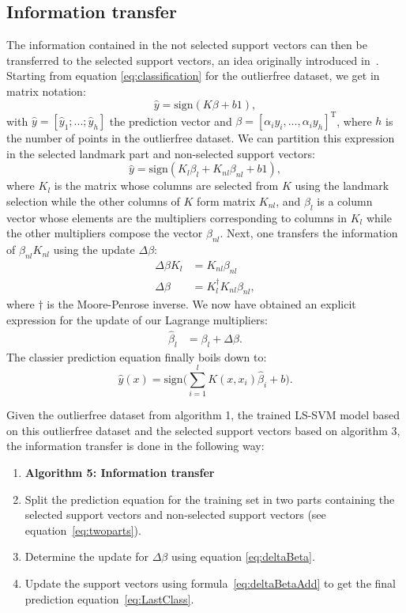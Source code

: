 \documentclass[preprint,12pt]{elsarticle}
\begin{document}
	\subsection{Information transfer}
	The information contained in the not selected support vectors can then be transferred to the selected support vectors, an idea originally introduced in~\cite{tao2009fast}. Starting from equation \eqref{eq:classification} for the outlierfree dataset, we get in matrix notation:
	\begin{equation}
\hat{y} = \mathrm{sign}(K\beta  + b 1),
	\end{equation}
with $\hat{y} = [\hat{y}_1;...;\hat{y}_h]$ the prediction vector and $\beta = [\alpha_i y_i ,...,\alpha_i y_{h}]^\mathrm{T}$, where $h$ is the number of points in the outlierfree dataset.
We can partition this expression in the selected landmark part and non-selected support vectors:
	\begin{equation}
	\label{eq:twoparts}
\hat{y} = \mathrm{sign}(K_l\beta_l + K_{nl}\beta_{nl}  + b 1),
	\end{equation}
	where $K_l $ is the matrix whose columns are selected from $K$ using the landmark selection while the other columns of $K$ form matrix $K_{nl}$, and $\beta_l$ is a column vector whose elements are the multipliers corresponding to columns in $K_l $ while the other multipliers compose the vector $ \beta_{nl}$.
	Next, one transfers the information of $\beta_{nl} K_{nl}$ using the update $\Delta\beta$: 
	\begin{align}
	\Delta \beta K_l &= K_{nl} \beta_{nl}   \\
	\Delta \beta &= K^\dagger_l  K_{nl} \beta_{nl},
	\label{eq:deltaBeta}
	\end{align}
	where $\dagger$ is the Moore-Penrose inverse. We now have obtained an explicit expression for the update of our Lagrange multipliers:
	\begin{align}
	\label{eq:deltaBetaAdd}
	\hat{\beta}_l &=\beta_l + \Delta \beta.
	\end{align}	
 The classier prediction equation finally boils down to:
	\begin{equation}
	\label{eq:LastClass}
\hat{y}(x) = \mathrm{sign}\Big(\sum_{i=1}^{l} K(x, x_i)\hat{\beta}_i  + b\Big).	
	\end{equation}
	
Given the outlierfree dataset from algorithm 1, the trained LS-SVM model based on this outlierfree dataset and the selected support vectors based on algorithm 3, the information transfer is done in the following way: 
	\begin{enumerate}
		\item[]\textbf{Algorithm 5: Information transfer}
		\item Split the prediction equation for the training set in two parts containing the selected support vectors and non-selected support vectors (see equation~\eqref{eq:twoparts}).
		\item Determine the update for $\Delta \beta$ using equation \eqref{eq:deltaBeta}.
		\item Update the support vectors using formula~\eqref{eq:deltaBetaAdd} to get the final prediction equation~\eqref{eq:LastClass}.
	\end{enumerate}
	
\end{document}

